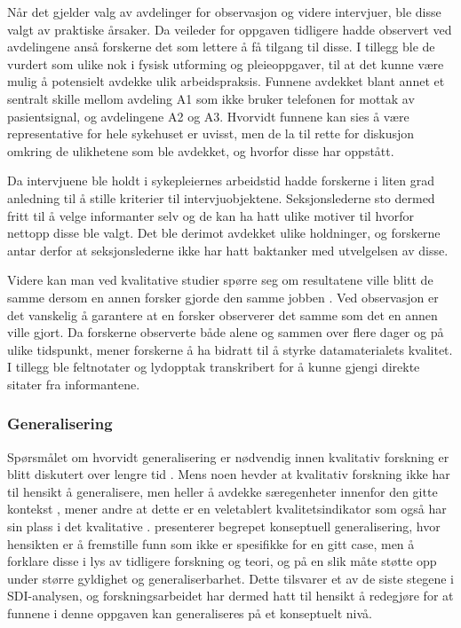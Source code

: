 \noindent
Når det gjelder valg av avdelinger for observasjon og videre intervjuer, ble disse valgt av praktiske årsaker. Da veileder for oppgaven tidligere hadde observert ved avdelingene anså forskerne det som lettere å få tilgang til disse. I tillegg ble de vurdert som ulike nok i fysisk utforming og pleieoppgaver, til at det kunne være mulig å potensielt avdekke ulik arbeidspraksis. Funnene avdekket blant annet et sentralt skille mellom avdeling A1 som ikke bruker telefonen for mottak av pasientsignal, og avdelingene A2 og A3. Hvorvidt funnene kan sies å være representative for hele sykehuset er uvisst, men de la til rette for diskusjon omkring de ulikhetene som ble avdekket, og hvorfor disse har oppstått. 

\noindent
Da intervjuene ble holdt i sykepleiernes arbeidstid hadde forskerne i liten grad anledning til å stille kriterier til intervjuobjektene. Seksjonslederne sto dermed fritt til å velge informanter selv og de kan ha hatt ulike motiver til hvorfor nettopp disse ble valgt. Det ble derimot avdekket ulike holdninger, og forskerne antar derfor at seksjonslederne ikke har hatt baktanker med utvelgelsen av disse.

\noindent
Videre kan man ved kvalitative studier spørre seg om resultatene ville blitt de samme dersom en annen forsker gjorde den samme jobben \citep{Tjora}. Ved observasjon er det  vanskelig å garantere at en forsker observerer det samme som det en annen ville gjort. Da forskerne observerte både alene og sammen over flere dager og på ulike tidspunkt, mener forskerne å ha bidratt til å styrke datamaterialets kvalitet. I tillegg ble feltnotater og lydopptak transkribert for å kunne gjengi direkte sitater fra informantene.

\subsubsection{Generalisering}
Spørsmålet om hvorvidt generalisering er nødvendig innen kvalitativ forskning er blitt diskutert over lengre tid \citep{Tjora}. Mens noen hevder at kvalitativ forskning ikke har til hensikt å generalisere, men heller å avdekke særegenheter innenfor den gitte kontekst \citep{Creswell, Oates}, mener andre at dette er en veletablert kvalitetsindikator som også har sin plass i det kvalitative \citep{Tjora}. \citet{Tjora} presenterer begrepet konseptuell generalisering, hvor hensikten er å fremstille funn som ikke er spesifikke for en gitt case, men å forklare disse i lys av tidligere forskning og teori, og på en slik måte støtte opp under større gyldighet og generaliserbarhet. Dette tilsvarer et av de siste stegene i SDI-analysen, og forskningsarbeidet har dermed hatt til hensikt å redegjøre for at funnene i denne oppgaven kan generaliseres på et konseptuelt nivå. 

